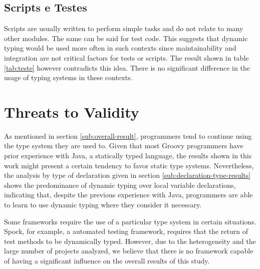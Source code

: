 \documentclass[preprint]{sigplanconf}
\begin{document}
\subsection{Scripts e Testes\label{sub:Scripts-e-Testes}}
Scripts are usually written to perform simple tasks and do not relate to many other modules. 
The same can be said for test code. 
This suggests that dynamic typing would be used more often in such contexts since maintainability and integration are not critical factors for tests or scripts. 
The result shown in table \ref{tab:teste} however contradicts this idea.
There is no significant difference in the usage of typing systems in these contexts.


\section{Threats to Validity\label{sec:ameaca}}
As mentioned in section \ref{sub:overall-result}, programmers tend to continue using the type system they are used to.
Given that most Groovy programmers have prior experience with Java, a statically typed language, the results shown in this work might present a certain tendency to favor static type systems. 
Nevertheless, the analysis by type of declaration given in section \ref{sub:declaration-type-results} shows the predominance of dynamic typing over local variable declarations, indicating that, despite the previous experience with Java,
programmers are able to learn to use dynamic typing where they consider it necessary.

Some frameworks require the use of a particular type system in certain situations. 
Spock, for example, a automated testing framework, requires that the return of test methods to be dynamically typed. 
However, due to the heterogeneity and the large number of projects analyzed, we believe that there is no framework capable of having a significant influence on the overall results of this study.
\end{document}
